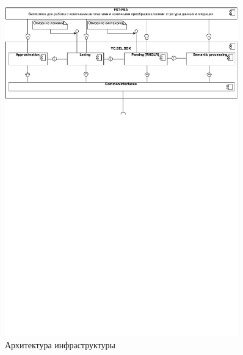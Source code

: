 \begin{figure}[h!]
\begin{center}
\includegraphics[width=0.9\textwidth]{pics/Components}
\caption{Архитектура инфраструктуры}
\label{fig:ReShSDKComponents} 
\end{center}
\end{figure}


